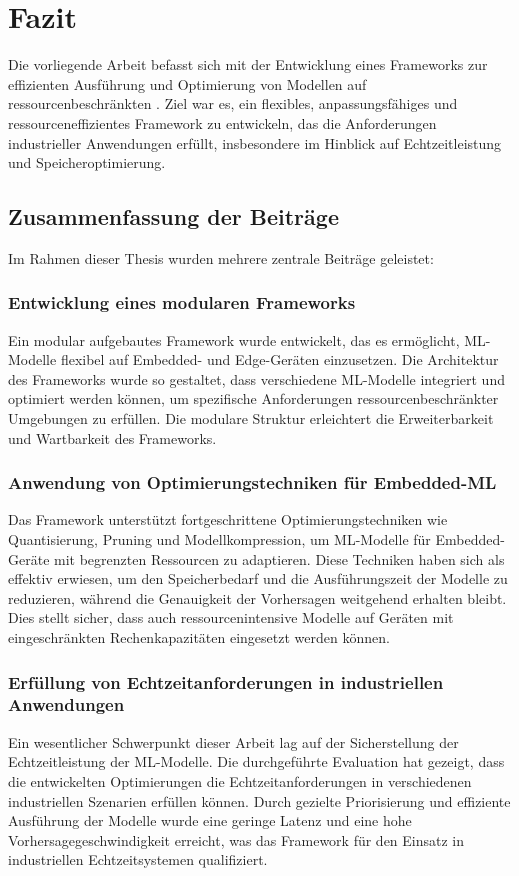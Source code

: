 \chapter{Fazit}
\label{chap:fazit}

Die vorliegende Arbeit befasst sich mit der Entwicklung eines Frameworks zur effizienten Ausführung und Optimierung von \ML Modellen 
auf ressourcenbeschränkten \Emb. Ziel war es, ein flexibles, anpassungsfähiges und ressourceneffizientes Framework zu entwickeln, 
das die Anforderungen industrieller Anwendungen erfüllt, insbesondere im Hinblick auf Echtzeitleistung und Speicheroptimierung.

\section{Zusammenfassung der Beiträge}
Im Rahmen dieser Thesis wurden mehrere zentrale Beiträge geleistet:

\subsection{Entwicklung eines modularen Frameworks}
Ein modular aufgebautes Framework wurde entwickelt, das es ermöglicht, ML-Modelle flexibel auf Embedded- und Edge-Geräten einzusetzen. 
Die Architektur des Frameworks wurde so gestaltet, dass verschiedene ML-Modelle integriert und optimiert werden können, um spezifische 
Anforderungen ressourcenbeschränkter Umgebungen zu erfüllen. Die modulare Struktur erleichtert die Erweiterbarkeit und Wartbarkeit des Frameworks.

\subsection{Anwendung von Optimierungstechniken für Embedded-ML}
Das Framework unterstützt fortgeschrittene Optimierungstechniken wie Quantisierung, Pruning und Modellkompression, um ML-Modelle 
für Embedded-Geräte mit begrenzten Ressourcen zu adaptieren. Diese Techniken haben sich als effektiv erwiesen, um den Speicherbedarf 
und die Ausführungszeit der Modelle zu reduzieren, während die Genauigkeit der Vorhersagen weitgehend erhalten bleibt. 
Dies stellt sicher, dass auch ressourcenintensive Modelle auf Geräten mit eingeschränkten Rechenkapazitäten eingesetzt werden können.

\subsection{Erfüllung von Echtzeitanforderungen in industriellen Anwendungen}
Ein wesentlicher Schwerpunkt dieser Arbeit lag auf der Sicherstellung der Echtzeitleistung der ML-Modelle. Die durchgeführte Evaluation hat gezeigt, 
dass die entwickelten Optimierungen die Echtzeitanforderungen in verschiedenen industriellen Szenarien erfüllen können. 
Durch gezielte Priorisierung und effiziente Ausführung der Modelle wurde eine geringe Latenz und eine hohe Vorhersagegeschwindigkeit erreicht, 
was das Framework für den Einsatz in industriellen Echtzeitsystemen qualifiziert.

